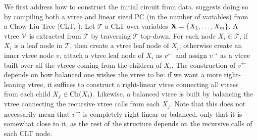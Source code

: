 We first address how to construct the initial circuit from data. \citeauthor{dang20} suggests doing
so by compiling both a vtree and linear sized PC (in the number of variables) from a Chow-Liu Tree
(CLT, \cite{chow68}). Let $\mathcal{T}$ a CLT over variables $\mathbf{X}=\{X_1,\ldots,X_m\}$. A vtree
$\operatorname{\mathcal{V}}$ is extracted from $\mathcal{T}$ by traversing $\mathcal{T}$ top-down. For each node
$X_i\in\mathcal{T}$, if $X_i$ is a leaf node in $\mathcal{T}$, then create a vtree leaf node of
$X_i$; otherwise create an inner vtree node $v$, attach a vtree leaf node of $X_i$ as $v^\gets$ and
assign $v^\to$ as a vtree built over all the vtrees coming from the children of $X_i$. The
construction of $v^\gets$ depends on how balanced one wishes the vtree to be: if we want a more
right-leaning vtree, it suffices to construct a right-linear vtree connecting all vtrees from each
child $X_j\in\operatorname*{\normalfont{Ch}}(X_i)$. Likewise, a balanced vtree is built by balancing the vtree connecting the
recursive vtree calls from each $X_j$. Note that this does not necessarily mean that $v^\to$ is
completely right-linear or balanced, only that it is somewhat close to it, as the rest of the
structure depends on the recursive calls of each CLT node.


